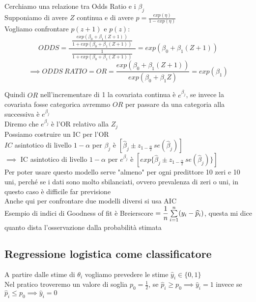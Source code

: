Cerchiamo una relazione tra Odds Ratio e i $\beta_j$\\
Supponiamo di avere $Z$ continua e di avere $p=\frac{exp(\eta)}{1-exp(\eta)}$\\
Vogliamo confrontare $p(z+1)$ e $p(z)$:
\[
ODDS = \frac{\ \ \frac{exp(\beta_0+\beta_1(Z+1))}{1+exp(\beta_0+\beta_1(Z+1))} \ \ }{\frac{1}{1+exp(\beta_0+\beta_1(Z+1))}} = exp(\beta_0+\beta_1(Z+1))
\]
\[
\implies ODDS \ RATIO = OR = \frac{exp(\beta_0+\beta_1(Z+1))}{exp(\beta_0+\beta_1Z)}= exp(\beta_1)
\]

Quindi $OR$ nell'incrementare di 1 la covariata continua è $e^{\beta_j}$, se invece la covariata fosse categorica avremmo $OR$ per passare da una categoria alla successiva è $e^{\beta_j}$\\

Diremo che $e^{\beta_j}$ è l'OR relativo alla $Z_j$\\
Possiamo costruire un IC per l'OR\\
$IC$ asintotico di livello $1-\alpha$ per $\beta_j$ è $[\hat{\beta}_j \pm z_{1-\tfrac{\alpha}{2}} \, se(\hat{\beta}_j)]$\\
$\implies$ IC asintotico di livello $1-\alpha$ per $e^{\beta_j}$ è $[exp\{\hat{\beta}_j \pm z_{1-\tfrac{\alpha}{2}} \, se(\hat{\beta}_j)\}]$\\

Per poter usare questo modello serve "almeno" per ogni predittore 10 zeri e 10 uni, perché se i dati sono molto sbilanciati, ovvero prevalenza di zeri o uni, in questo caso è difficile far previsione\\

Anche qui per confrontare due modelli diversi si usa AIC\\

Esempio di indici di Goodness of fit è Breierscore $=\dfrac{1}{n}\sum\limits_{i=1}^{n}(y_i-\widehat{p}_i)$, questa mi dice quanto dista l'osservazione dalla probabilità stimata\\




\subsection{Regressione logistica come classificatore}



A partire dalle stime di $\theta_i$ vogliamo prevedere le stime $\hat{y}_i \in \{0,1\}$\\
Nel pratico troveremo un valore di soglia $p_0=\frac12$, se $\hat{p}_i\ge p_0 \implies \hat{y}_i =1$ invece se $\hat{p}_i\le p_0 \implies \hat{y}_i =0$\\

